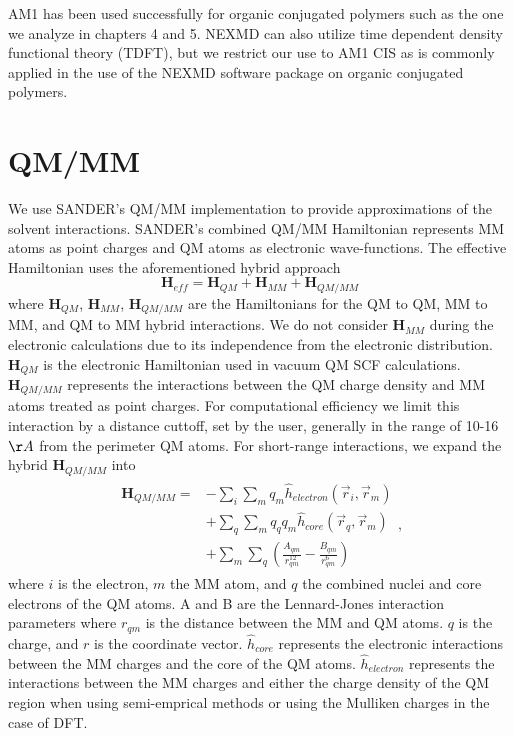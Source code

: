 AM1 has been used successfully for organic conjugated polymers such as the one we analyze in chapters 4 and 5. \cite{ozaki2019molecular,silva2010benchmark,moran2003excited,cornil1994optical,weingart2012modelling}
NEXMD can also utilize time dependent density functional theory (TDFT),
but we restrict our use to AM1 CIS as is commonly applied in the use of the NEXMD software package on organic conjugated polymers. \cite{tretiak2003resonant}

\section{QM/MM}
We use SANDER's QM/MM implementation to provide approximations of the solvent interactions.\cite{Walker2008}
SANDER's combined QM/MM Hamiltonian represents MM atoms as point charges and QM atoms as electronic wave-functions.
The effective Hamiltonian uses the aforementioned hybrid approach
\begin{equation}
  \mathbf{H}_{eff} = \mathbf{H}_{QM} + \mathbf{H}_{MM} + \mathbf{H}_{QM/MM}
\end{equation}
where \(\mathbf{H}_{QM}\), \(\mathbf{H}_{MM}\), \(\mathbf{H}_{QM/MM}\) are the Hamiltonians for the QM to QM, MM to MM, and QM to MM hybrid interactions.
We do not consider \(\mathbf{H}_{MM}\) during the electronic calculations due to its independence from the electronic distribution.
\(\mathbf{H}_{QM}\) is the electronic Hamiltonian used in vacuum QM SCF calculations.
\(\mathbf{H}_{QM/MM}\) represents the interactions between the QM charge density and MM atoms treated as point charges.
For computational efficiency we limit this interaction by a distance cuttoff, set by the user, generally in the range of 10-16 \(\AA\) from the perimeter QM atoms.
For short-range interactions, we expand the hybrid \(\mathbf{H}_{QM/MM}\) into
\begin{align}\label{eq:qmmm}
  \begin{split}
    \mathbf{H}_{QM/MM} = &- \sum_i \sum_m q_m \hat{h}_{electron} (\vec{r}_i,  \vec{r}_m)\\
    &+ \sum_q \sum_m q_q q_m \hat{h}_{core} (\vec{r}_q, \vec{r}_m)\\
    &+ \sum_m \sum_q \left( \frac{A_{qm}}{r_{qm}^{12}} - \frac{B_{qm}}{r_{qm}^6} \right)
  \end{split},
\end{align}
where \(i\) is the electron, \(m\) the MM atom, and \(q\) the combined nuclei and core electrons of the QM atoms.
A and B are the Lennard-Jones interaction parameters where \(r_{qm}\) is the distance between the MM and QM atoms.
\(q\) is the charge, and \(r\) is the coordinate vector.
\(\hat{h}_{core}\) represents the electronic interactions between the MM charges and the core of the QM atoms.
\(\hat{h}_{electron}\) represents the interactions between the MM charges and either the charge density of the QM region when using semi-emprical methods or using the Mulliken charges in the case of DFT.

